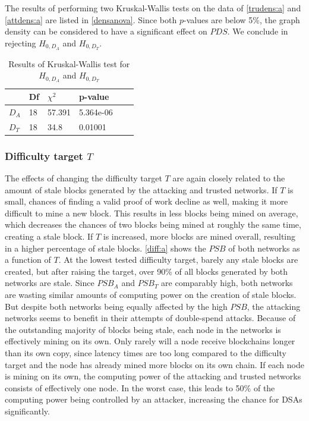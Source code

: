 \documentclass[a4paper,12pt,twoside]{report}
\begin{document}
The results of performing two Kruskal-Wallis tests on the data of \autoref{trudens:a} and \autoref{attdens:a} are listed in \autoref{densanova}. Since both $p$-values are below 5\%, the graph density can be considered to have a significant effect on $PDS$. We conclude in rejecting $H_{0,D_A}$ and $H_{0,D_T}$.
\begin{table}[h!]
\centering
\begin{tabular}{|l|l|l|l|l|l|} \hline
& Df & $\chi^{2}$ & p-value \\ \hline
$D_A$ & 18 &  57.391 & 5.364e-06 \\ \hline
$D_T$ & 18 & 34.8 & 0.01001 \\ \hline
\end{tabular}
\caption{Results of Kruskal-Wallis test for $H_{0,D_A}$ and $H_{0,D_T}$}
\label{densanova}
\end{table}

\subsubsection{Difficulty target $T$} \label{diffanalysis}
The effects of changing the difficulty target $T$ are again closely related to the amount of stale blocks generated by the attacking and trusted networks. If $T$ is small, chances of finding a valid proof of work decline as well, making it more difficult to mine a new block. This results in less blocks being mined on average, which decreases the chances of two blocks being mined at roughly the same time, creating a stale block. If $T$ is increased, more blocks are mined overall, resulting in a higher percentage of stale blocks. \autoref{diff:a} shows the $PSB$ of both networks as a function of $T$. At the lowest tested difficulty target, barely any stale blocks are created, but after raising the target, over 90\% of all blocks generated by both networks are stale. Since $PSB_A$ and $PSB_T$ are comparably high, both networks are wasting similar amounts of computing power on the creation of stale blocks. But despite both networks being equally affected by the high $PSB$, the attacking networks seems to benefit in their attempts of double-spend attacks. Because of the outstanding majority of blocks being stale, each node in the networks is effectively mining on its own. Only rarely will a node receive blockchains longer than its own copy, since latency times are too long compared to the difficulty target and the node has already mined more blocks on its own chain. If each node is mining on its own, the computing power of the attacking and trusted networks consists of effectively one node. In the worst case, this leads to 50\% of the computing power being controlled by an attacker, increasing the chance for DSAs significantly.
\end{document}
